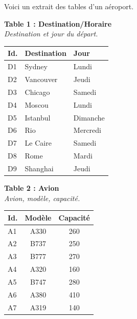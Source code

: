 \documentclass[class=report,crop=false, 12pt]{standalone}
\begin{document}
\begin{enigme}


Voici un extrait des tables d'un aéroport.

\bigskip

\begin{center}
{\footnotesize

%
\begin{minipage}{0.35\textwidth}

\textbf{Table 1 : Destination/Horaire}\\
\emph{Destination et jour du départ.} \\

\begin{tabular}{|l|l|l|} \hline
\textbf{Id.} & \textbf{Destination} & \textbf{Jour} \\ \hline\hline
D1 & Sydney & Lundi \\ \hline
D2 & Vancouver & Jeudi \\ \hline
D3 & Chicago & Samedi \\ \hline
D4 & Moscou & Lundi \\ \hline
D5 & Istanbul & Dimanche \\ \hline
D6 & Rio & Mercredi \\ \hline
D7 & Le Caire & Samedi \\ \hline
D8 & Rome & Mardi \\ \hline
D9 & Shanghai & Jeudi \\ \hline
\end{tabular}
\end{minipage}
\begin{minipage}{0.3\textwidth}
\textbf{Table 2 : Avion}\\
\emph{Avion, modèle, capacité.} \\

\begin{tabular}{|l|c|c|} \hline
\textbf{Id.} & \textbf{Modèle}& \textbf{Capacité} \\ \hline\hline
A1 & A330 & 260 \\ \hline
A2 & B737 & 250 \\ \hline
A3 & B777 & 270 \\ \hline
A4 & A320 & 160 \\ \hline
A5 & B747 & 280 \\ \hline
A6 & A380 & 410 \\ \hline
A7 & A319 & 140 \\ \hline
\end{tabular}
\end{minipage}
%
\begin{minipage}{0.3\textwidth}


\end{minipage}}
\end{center}
\end{enigme}
\end{document}
